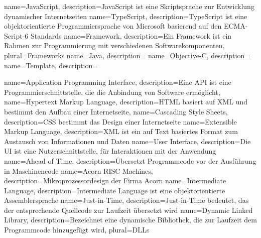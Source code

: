 
{
	name=JavaScript,
	description={JavaScript ist eine Skriptsprache zur Entwicklung dynamischer Internetseiten}
}
{
	name=TypeScript,
	description={TypeScript ist eine objektorientierte Programmiersprache von Microsoft basierend auf den ECMA-Script-6 Standards}
}
{
	name=Framework,
	description={Ein Framework ist ein Rahmen zur Programmierung mit verschiedenen Softwarekomponenten},
	plural=Frameworks
}
{
	name=Java,
	description={}
}
{
	name=Objective-C,
	description={}
}
{
	name=Template,
	description={}
}

 {
	name={Application Programming Interface},
	description={Eine API ist eine Programmierschnittstelle, die die Anbindung von Software ermöglicht},
}
{
	name=Hypertext Markup Language,
	description={HTML basiert auf XML und bestimmt den Aufbau einer Internetseite},
}
{
	name=Cascading Style Sheets,
	description={CSS bestimmt das Design einer Internetseite}
}
{
	name=Extensible Markup Language,
	description={XML ist ein auf Text basiertes Format zum Austausch von Informationen und Daten}
}
{
	name=User Interface,
	description={Die UI ist eine Nutzerschnittstelle, für Interaktionen mit der Anwendung}
}
{
	name=Ahead of Time,
	description={Übersetzt Programmcode vor der Ausführung in Maschinencode}
}
{
	name=Acorn RISC Machines,
	description={Mikroprozessordesign der Firma Acorn}
}
{
	name=Intermediate Language,
	description={Intermediate Language ist eine objektorientierte Assemblersprache}
}
{
	name=Just-in-Time,
	description={Just-in-Time bedeutet, das der entsprechende Quellcode zur Laufzeit übersetzt wird}
}
{
	name=Dynamic Linked Library,
	description={Bezeichnet eine dynamische Bibliothek, die zur Laufzeit dem Programmcode hinzugefügt wird},
	plural=DLLs
}

